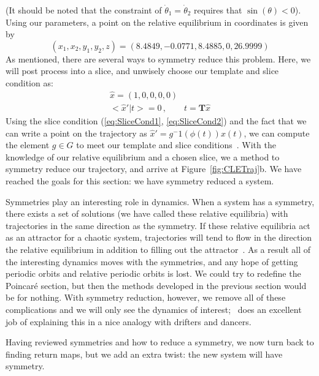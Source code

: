 \documentclass[10pt,letter]{article}
\begin{document}
(It should be noted that the constraint of $\dot \theta_1 = \dot
\theta_2$ requires that $\sin(\theta) < 0$).  Using our parameters, a
point on the relative equilibrium in coordinates is given by~\cite{CB}
\[
(x_1, x_2, y_1, y_2, z) = (8.4849,-0.0771,8.4885,0,26.9999)
\]
As mentioned, there are several ways to symmetry reduce this problem.
Here, we will post process into a slice, and unwisely choose our template
and slice condition as:
\begin{equation}
\begin{split}
\hat{x} = (1, 0, 0, 0 , 0)\\
<\hat{x}'|t> = 0
    \,,\qquad
 t = \mathbf{T}\hat{x}
\label{eq:CLEslice}
\end{split}
\end{equation}
Using the slice condition (\ref{eq:SliceCond1}, \ref{eq:SliceCond2}) and
the fact that we can write a point on the trajectory as $\hat{x}' =
g^-1(\phi(t))x(t)$, we can compute the element $g \in G$ to meet our
template and slice conditions~\cite{SliceCond}. With the knowledge of our
relative equilibrium and a chosen slice, we a method to symmetry reduce
our trajectory, and arrive at Figure~\ref{fig:CLETraj}b.  We have reached
the goals for this section: we have symmetry reduced a system.

Symmetries play an interesting role in dynamics.  When a system has a
symmetry, there exists a set of solutions (we have called these relative
equilibria) with trajectories in the same direction as the symmetry.  If
these relative equilibria act as an attractor for a chaotic system,
trajectories will tend to flow in the direction the relative equilibrium
in addition to filling out the attractor~\cite{Atl}.  As a result all of
the interesting dynamics moves with the symmetries, and any hope of
getting periodic orbits and relative periodic orbits is lost.  We could
try to redefine the Poincar\'e section, but then the methods developed in
the previous section would be for nothing.  With symmetry reduction,
however, we remove all of these complications and we will only see the
dynamics of interest;~\cite{Atl} does an excellent job of explaining this
in a nice analogy with drifters and dancers.

Having reviewed symmetries and how to reduce a symmetry, we now turn back
to finding return maps, but we add an extra twist: the new system will
have symmetry.
\end{document}
